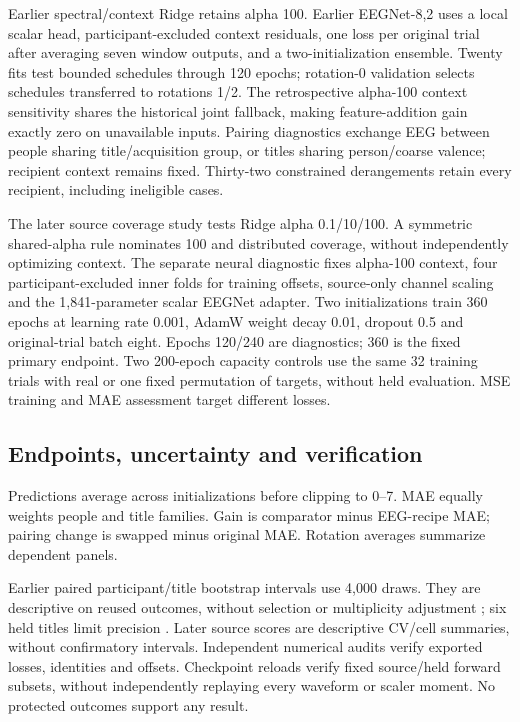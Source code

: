 \documentclass[11pt,a4paper]{article}
\begin{document}
Earlier spectral/context Ridge retains alpha 100. Earlier EEGNet-8,2 uses a local scalar head, participant-excluded context residuals, one loss per original trial after averaging seven window outputs, and a two-initialization ensemble. Twenty fits test bounded schedules through 120 epochs; rotation-0 validation selects schedules transferred to rotations 1/2. The retrospective alpha-100 context sensitivity shares the historical joint fallback, making feature-addition gain exactly zero on unavailable inputs. Pairing diagnostics exchange EEG between people sharing title/acquisition group, or titles sharing person/coarse valence; recipient context remains fixed. Thirty-two constrained derangements retain every recipient, including ineligible cases.

The later source coverage study tests Ridge alpha 0.1/10/100. A symmetric shared-alpha rule nominates 100 and distributed coverage, without independently optimizing context. The separate neural diagnostic fixes alpha-100 context, four participant-excluded inner folds for training offsets, source-only channel scaling and the 1,841-parameter scalar EEGNet adapter. Two initializations train 360 epochs at learning rate 0.001, AdamW weight decay 0.01, dropout 0.5 and original-trial batch eight. Epochs 120/240 are diagnostics; 360 is the fixed primary endpoint. Two 200-epoch capacity controls use the same 32 training trials with real or one fixed permutation of targets, without held evaluation. MSE training and MAE assessment target different losses.

\subsection{Endpoints, uncertainty and verification}
Predictions average across initializations before clipping to 0--7. MAE equally weights people and title families. Gain is comparator minus EEG-recipe MAE; pairing change is swapped minus original MAE. Rotation averages summarize dependent panels.

Earlier paired participant/title bootstrap intervals use 4,000 draws. They are descriptive on reused outcomes, without selection or multiplicity adjustment \cite{owen2007,owen2012}; six held titles limit precision \cite{westfall2014power}. Later source scores are descriptive CV/cell summaries, without confirmatory intervals. Independent numerical audits verify exported losses, identities and offsets. Checkpoint reloads verify fixed source/held forward subsets, without independently replaying every waveform or scaler moment. No protected outcomes support any result.
\end{document}
